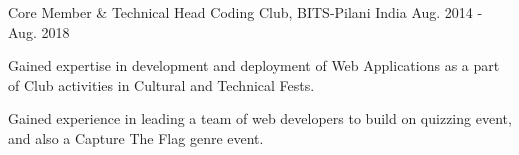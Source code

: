 

\begin{cventries}

  \cventry
    {Core Member \& Technical Head} %
    {Coding Club, BITS-Pilani} %
    {India} %
    {Aug. 2014 - Aug. 2018} %
    {
      \begin{cvitems} %
        \item {Gained expertise in development and deployment of Web Applications as a part of Club activities in Cultural and Technical Fests. }
        \item {Gained experience in leading a team of web developers to build on quizzing event, and also a Capture The Flag genre event.}
      \end{cvitems}
    }
\end{cventries}
